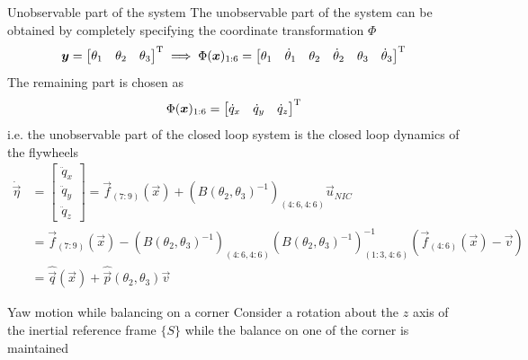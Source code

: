 \begin{frame}[shrink=10]{Unobservable part of the system}
  The unobservable part of the system can be obtained by completely specifying
  the coordinate transformation $\Phi$
  \[
  \boldsymbol{y} =
  \begin{bmatrix}
    \theta_1 &
    \theta_2 &
    \theta_3
  \end{bmatrix}^{\mathrm{T}}
  \implies
  \Phi(\boldsymbol{x})_{1:6} =
  \begin{bmatrix}
    \theta_1 & \dot{\theta}_1 &  \theta_2 & \dot{\theta}_2 &
    \theta_3 & \dot{\theta}_3
  \end{bmatrix}^{\mathrm{T}}
  \]
  The remaining part is chosen as
  \[
  \Phi(\boldsymbol{x})_{1:6} =
  \begin{bmatrix}
    \dot{q}_x & \dot{q}_y & \dot{q}_z
  \end{bmatrix}^{\mathrm{T}}
  \]
  i.e. the unobservable part of the closed loop system is the closed loop dynamics of the
  flywheels
  \[
  \begin{split}
    \dot{\vec{\eta}} &=
    \begin{bmatrix}
      \ddot{q}_{x}\\
      \ddot{q}_{y}\\
      \ddot{q}_{z}
    \end{bmatrix}
    = \vec{f}_{(7:9)}(\vec{x}) + \left(B(\theta_2,\theta_3) ^ {-1}\right)_{(4:6, 4:6)} \vec{u}_{NIC}\\
    &=\vec{f}_{(7:9)}(\vec{x}) - \left(B(\theta_2,\theta_3) ^ {-1}\right)_{(4:6, 4:6)}
    \left(B(\theta_2,\theta_3) ^ {-1}\right)_{(1:3, 4:6)}^{-1}
    (\vec{f}_{(4:6)}(\vec{x}) - \vec{v})\\
    &=\hat{\vec{q}}(\vec{x}) + \hat{\vec{p}}(\theta_{2},\theta_{3})\vec{v}
  \end{split}
  \]
\end{frame}

\begin{frame}{Yaw motion while balancing on a corner}
  Consider a rotation about the $z$ axis of the inertial
  reference frame $\{S\}$ while the balance on one of the corner is maintained
  \begin{center}
  \end{center}
\end{frame}

